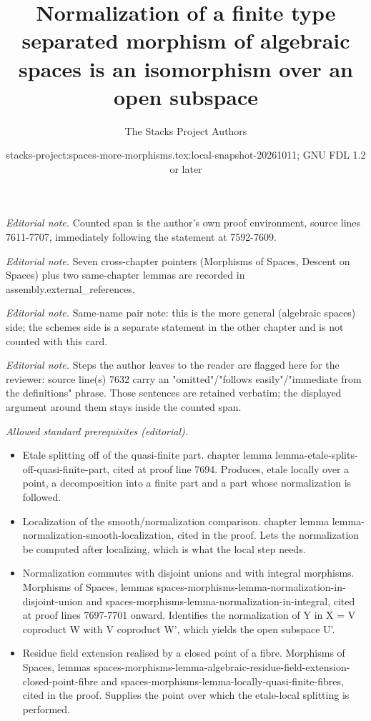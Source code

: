 \documentclass[10pt,a4paper]{amsart}
\title{Normalization of a finite type separated morphism of algebraic spaces is an isomorphism over an open subspace}
\author{The Stacks Project Authors}
\date{stacks-project:spaces-more-morphisms.tex:local-snapshot-20261011; GNU FDL 1.2 or later}
\theoremstyle{plain}
\theoremstyle{definition}
\theoremstyle{remark}
\numberwithin{equation}{subsection}
\begin{document}
\maketitle
\noindent\textit{Editorial note.} Counted span is the author's own proof environment, source lines 7611-7707, immediately following the statement at 7592-7609.\par\medskip
\noindent\textit{Editorial note.} Seven cross-chapter pointers (Morphisms of Spaces, Descent on Spaces) plus two same-chapter lemmas are recorded in assembly.external\_references.\par\medskip
\noindent\textit{Editorial note.} Same-name pair note: this is the more general (algebraic spaces) side; the schemes side is a separate statement in the other chapter and is not counted with this card.\par\medskip
\noindent\textit{Editorial note.} Steps the author leaves to the reader are flagged here for the reviewer: source line(s) 7632 carry an "omitted"/"follows easily"/"immediate from the definitions" phrase. Those sentences are retained verbatim; the displayed argument around them stays inside the counted span.\par\medskip
\noindent\textit{Allowed standard prerequisites (editorial).}\begin{itemize}
\item Etale splitting off of the quasi-finite part. chapter lemma lemma-etale-splits-off-quasi-finite-part, cited at proof line 7694. Produces, etale locally over a point, a decomposition into a finite part and a part whose normalization is followed.
\item Localization of the smooth/normalization comparison. chapter lemma lemma-normalization-smooth-localization, cited in the proof. Lets the normalization be computed after localizing, which is what the local step needs.
\item Normalization commutes with disjoint unions and with integral morphisms. Morphisms of Spaces, lemmas spaces-morphisms-lemma-normalization-in-disjoint-union and spaces-morphisms-lemma-normalization-in-integral, cited at proof lines 7697-7701 onward. Identifies the normalization of Y in X = V coproduct W with V coproduct W', which yields the open subspace U'.
\item Residue field extension realised by a closed point of a fibre. Morphisms of Spaces, lemmas spaces-morphisms-lemma-algebraic-residue-field-extension-closed-point-fibre and spaces-morphisms-lemma-locally-quasi-finite-fibres, cited in the proof. Supplies the point over which the etale-local splitting is performed.
\end{itemize}\medskip
\end{document}
